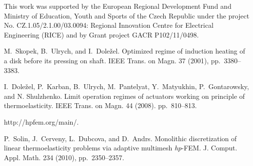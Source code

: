 This work was supported by the European Regional Development Fund and Ministry of Education, Youth and Sports of the Czech Republic under the project No. CZ.1.05/2.1.00/03.0094: Regional Innovation Centre for Electrical Engineering (RICE) and by Grant project GACR P102/11/0498.


\begin{thebibliography}{10}

{\sc M.~Skopek, B.~Ulrych, and I.~Dole\v{z}el}. {Optimized regime of induction
heating of a disk before its pressing on shaft}. IEEE Trans. on Magn. 37 (2001),
pp.~3380--3383.

{\sc I.~Dole\v{z}el, P.~Karban, B.~Ulrych, M.~Pantelyat, Y.~Matyukhin,
P.~Gontarowsky, and N. Shulzhenko}. {Limit operation regimes of actuators working
on principle of thermoelasticity}. IEEE Trans. on Magn. 44 (2008).
pp.~810--813.

{http://hpfem.org/main/}.

{\sc P.~Solin, J.~Cerveny, L.~Dubcova, and D.~Andrs}. {Monolithic discretization
of linear thermoelasticity problems via adaptive multimesh \textit{hp}-FEM}.
J. Comput. Appl. Math. 234 (2010), pp.~2350--2357.

\end{thebibliography}